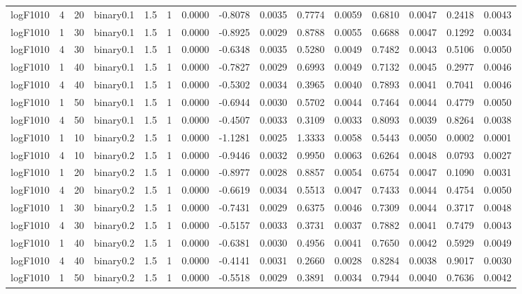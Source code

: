 \begin{longtable}{rrrrrrrrrrrrrrr}
  logF1010 & 4 & 20 & binary0.1 & 1.5 & 1 & 0.0000 & -0.8078 & 0.0035 & 0.7774 & 0.0059 & 0.6810 & 0.0047 & 0.2418 & 0.0043 \\ 
  logF1010 & 1 & 30 & binary0.1 & 1.5 & 1 & 0.0000 & -0.8925 & 0.0029 & 0.8788 & 0.0055 & 0.6688 & 0.0047 & 0.1292 & 0.0034 \\ 
  logF1010 & 4 & 30 & binary0.1 & 1.5 & 1 & 0.0000 & -0.6348 & 0.0035 & 0.5280 & 0.0049 & 0.7482 & 0.0043 & 0.5106 & 0.0050 \\ 
  logF1010 & 1 & 40 & binary0.1 & 1.5 & 1 & 0.0000 & -0.7827 & 0.0029 & 0.6993 & 0.0049 & 0.7132 & 0.0045 & 0.2977 & 0.0046 \\ 
  logF1010 & 4 & 40 & binary0.1 & 1.5 & 1 & 0.0000 & -0.5302 & 0.0034 & 0.3965 & 0.0040 & 0.7893 & 0.0041 & 0.7041 & 0.0046 \\ 
  logF1010 & 1 & 50 & binary0.1 & 1.5 & 1 & 0.0000 & -0.6944 & 0.0030 & 0.5702 & 0.0044 & 0.7464 & 0.0044 & 0.4779 & 0.0050 \\ 
  logF1010 & 4 & 50 & binary0.1 & 1.5 & 1 & 0.0000 & -0.4507 & 0.0033 & 0.3109 & 0.0033 & 0.8093 & 0.0039 & 0.8264 & 0.0038 \\ 
  logF1010 & 1 & 10 & binary0.2 & 1.5 & 1 & 0.0000 & -1.1281 & 0.0025 & 1.3333 & 0.0058 & 0.5443 & 0.0050 & 0.0002 & 0.0001 \\ 
  logF1010 & 4 & 10 & binary0.2 & 1.5 & 1 & 0.0000 & -0.9446 & 0.0032 & 0.9950 & 0.0063 & 0.6264 & 0.0048 & 0.0793 & 0.0027 \\ 
  logF1010 & 1 & 20 & binary0.2 & 1.5 & 1 & 0.0000 & -0.8977 & 0.0028 & 0.8857 & 0.0054 & 0.6754 & 0.0047 & 0.1090 & 0.0031 \\ 
  logF1010 & 4 & 20 & binary0.2 & 1.5 & 1 & 0.0000 & -0.6619 & 0.0034 & 0.5513 & 0.0047 & 0.7433 & 0.0044 & 0.4754 & 0.0050 \\ 
  logF1010 & 1 & 30 & binary0.2 & 1.5 & 1 & 0.0000 & -0.7431 & 0.0029 & 0.6375 & 0.0046 & 0.7309 & 0.0044 & 0.3717 & 0.0048 \\ 
  logF1010 & 4 & 30 & binary0.2 & 1.5 & 1 & 0.0000 & -0.5157 & 0.0033 & 0.3731 & 0.0037 & 0.7882 & 0.0041 & 0.7479 & 0.0043 \\ 
  logF1010 & 1 & 40 & binary0.2 & 1.5 & 1 & 0.0000 & -0.6381 & 0.0030 & 0.4956 & 0.0041 & 0.7650 & 0.0042 & 0.5929 & 0.0049 \\ 
  logF1010 & 4 & 40 & binary0.2 & 1.5 & 1 & 0.0000 & -0.4141 & 0.0031 & 0.2660 & 0.0028 & 0.8284 & 0.0038 & 0.9017 & 0.0030 \\ 
  logF1010 & 1 & 50 & binary0.2 & 1.5 & 1 & 0.0000 & -0.5518 & 0.0029 & 0.3891 & 0.0034 & 0.7944 & 0.0040 & 0.7636 & 0.0042 \\ 

\end{longtable}
